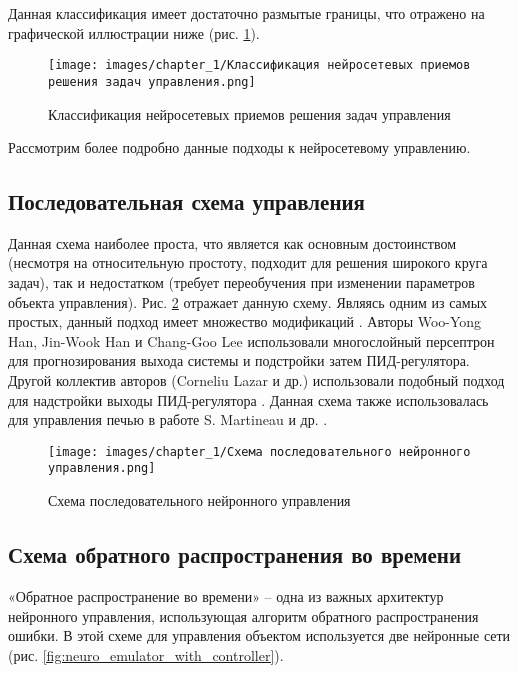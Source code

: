 Данная классификация имеет достаточно размытые границы, что отражено на графической иллюстрации ниже (рис. \ref{fig:neuro_control_classification}).

\begin{figure}[H]
    \centering
    \texttt{[image: images/chapter\_1/Классификация нейросетевых приемов решения задач управления.png]}
    \caption{Классификация нейросетевых приемов решения задач управления}
    \label{fig:neuro_control_classification}
\end{figure}

Рассмотрим более подробно данные подходы к нейросетевому управлению.

\subsection{Последовательная схема управления}

Данная схема наиболее проста, что является как основным достоинством (несмотря на относительную простоту, подходит для решения широкого круга задач), так и недостатком (требует переобучения при изменении параметров объекта управления). Рис. \ref{fig:serial_neuro_control_scheme} отражает данную схему. Являясь одним из самых простых, данный подход имеет множество модификаций \cite{Ruano1992ApplicationsON}. Авторы Woo-Yong Han, Jin-Wook Han и Chang-Goo Lee \cite{Han1999} использовали многослойный персептрон для прогнозирования выхода системы и подстройки затем ПИД-регулятора. Другой коллектив авторов (Corneliu Lazar и др.) использовали подобный подход для надстройки выходы ПИД-регулятора \cite{Lazar2004}. Данная схема также использовалась для управления печью в работе S. Martineau и др. \cite{Martineau2003}.

\begin{figure}[H]
    \centering
    \texttt{[image: images/chapter\_1/Схема последовательного нейронного управления.png]}
    \caption{Схема последовательного нейронного управления}
    \label{fig:serial_neuro_control_scheme}
\end{figure}

\subsection{Схема обратного распространения во времени}

«Обратное распространение во времени» – одна из важных архитектур нейронного управления, использующая алгоритм обратного распространения ошибки. В этой схеме для управления объектом используется две нейронные сети (рис. \ref{fig:neuro_emulator_with_controller}).

